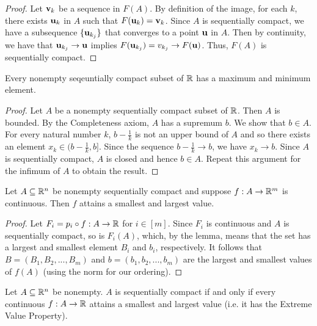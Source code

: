 \documentclass[letterpaper, twoside, 12pt]{book}
\begin{document}
\begin{proof}
    Let \(\mathbf v_k\) be a sequence in \(F(A)\). By definition of 
    the image, for each \(k\), there exists \(\mathbf u_k\) in \(A\)
    such that \(F(\mathbf u_k) = \mathbf v_k\). Since \(A\) is sequentially
    compact, we have a subsequence \(\{\mathbf u_{k_j}\}\) that converges
    to a point \(\mathbf u\) in \(A\). Then by continuity, we have
    that \(\mathbf u_{k_j} \to \mathbf u\) implies 
    \(F(\mathbf u_{k_j}) = v_{k_j} \to F(\mathbf u)\). Thus, \(F(A)\) is 
    sequentially compact.
\end{proof}

\begin{lemma}[11.21]
  Every nonempty seqeuntially compact subset of \(\mathbb R\) has a
  maximum and minimum element.
\end{lemma}

\begin{proof}
    Let \(A\) be a nonempty sequentially compact subset of \(\mathbb R\).
    Then \(A\) is bounded. By the Completeness axiom, \(A\) has a
    supremum \(b\). We show that \(b \in A\). For every natural number
    \(k\), \(b - \frac{1}{k}\) is not an upper bound of \(A\) and so
    there exists an element \(x_k \in (b - \frac{1}{k}, b]\). Since
    the sequence \(b - \frac{1}{k} \to b\), we have \(x_k \to b\).
    Since \(A\) is sequentially compact, \(A\) is closed and hence
    \(b \in A\). Repeat this argument for the infimum of \(A\) to 
    obtain the result.
\end{proof}

\begin{theorem}
  Let \(A\subseteq\mathbb R^n\) be nonempty sequentially compact
  and suppose \(f:A\to\mathbb R^m\) is continuous.
  Then \(f\) attains a smallest and largest value.
\end{theorem}

\begin{proof}
    Let \(F_i = p_i \circ f: A \rightarrow \mathbb R\) for \(i \in [m]\). 
    Since \(F_i\) is continuous and \(A\) is sequentially compact,
    so is \(F_i(A)\), which, by the lemma, means that the set has
    a largest and smallest element \(B_i\) and \(b_i\), respectively.
    It follows that \(B = (B_1, B_2, ..., B_m)\) and \(b = (b_1, b_2, ..., b_m)\)
    are the largest and smallest values of \(f(A)\) (using the
    norm for our ordering). 
\end{proof}

\begin{theorem}[11.24]
  Let \(A\subseteq\mathbb R^n\) be nonempty.
  \(A\) is sequentially compact if and only if
  every continuous \(f:A\to\mathbb R\) attains a smallest and largest value
  (i.e. it has the Extreme Value Property).
\end{theorem}
\end{document}
